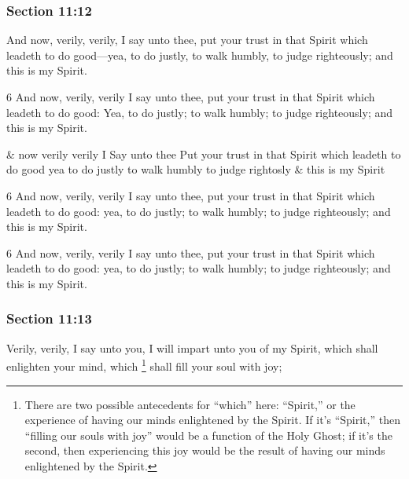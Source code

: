 	\subsubsection{Section 11:12} %
		\label{DC11-12}

		And now, verily, verily, I say unto thee, put your trust in that Spirit which leadeth to do good---yea, to do justly, to walk humbly, to judge righteously; and this is my Spirit.

		\begin{framed}
		\scriptsize
			\begin{compactdesc}
				\item[JSP] 6 And now, verily, verily I say unto thee, put your trust in that Spirit which leadeth to do good: Yea, to do justly; to walk humbly; to judge righteously; and this is my Spirit.
				\item[HS] \& now verily verily I Say unto thee Put your trust in that Spirit which leadeth to do good yea to do justly to walk humbly to judge rightosly \& this is my Spirit 
				\item[DC 1835] 6 And now, verily, verily I say unto thee, put your trust in that Spirit which leadeth to do good: yea, to do justly; to walk humbly; to judge righteously; and this is my Spirit.
				\item[DC 1844] 6 And now, verily, verily I say unto thee, put your trust in that Spirit which leadeth to do good: yea, to do justly; to walk humbly; to judge righteously; and this is my Spirit.
			\end{compactdesc}
		\end{framed}

	\subsubsection{Section 11:13} %
		\label{DC11-13}

		Verily, verily, I say unto you, I will impart unto you of my Spirit, which shall enlighten your mind, which%
			\footnote{%
				There are two possible antecedents for ``which'' here: ``Spirit,'' or the experience of having our minds enlightened by the Spirit. If it's ``Spirit,'' then ``filling our souls with joy'' would be a function of the Holy Ghost; if it's the second, then experiencing this joy would be the result of having our minds enlightened by the Spirit.
				}
		shall fill your soul with joy;

